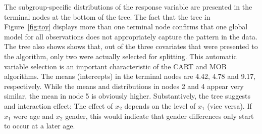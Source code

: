 \documentclass[doc,floatsintext,natbib]{apa7}
\begin{document}
The subgroup-specific distributions of the response variable are presented in the terminal nodes at the bottom of the tree. The fact that the tree in Figure~\ref{fig:toy} displays more than one terminal node confirms that one global model for all observations does not appropriately capture the pattern in the data.  The tree also shows shows that, out of the three covariates that were presented to the algorithm, only two were actually selected for splitting. This automatic variable selection is an important characteristic of the CART and MOB algorithms. The means (intercepts) in the terminal nodes are 4.42, 4.78 and 9.17, respectively. While the means and distributions in nodes 2 and 4 appear very similar, the mean in node 5 is obviously higher. Substantively, the tree suggests and interaction effect: The effect of $x_2$ depends on the level of $x_1$ (vice versa). If $x_1$ were age and $x_2$ gender, this would indicate that gender differences only start to occur at a later age.   




\end{document}
